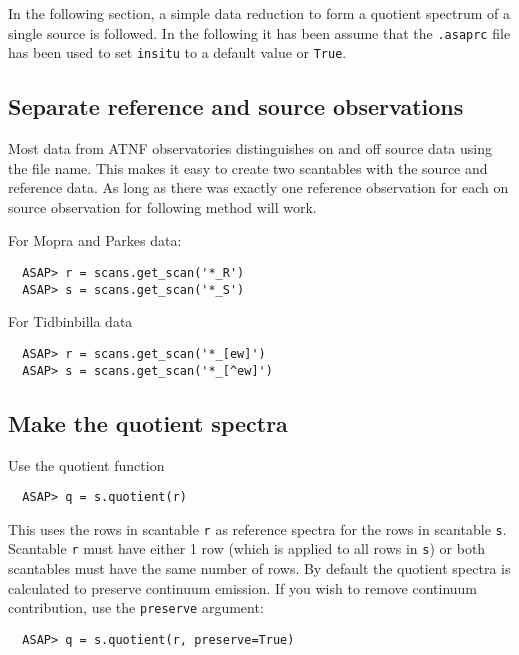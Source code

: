 \documentclass[11pt]{article}
\newcommand{\cmd}[1]{{\tt #1}}
\begin{document}
In the following section, a simple data reduction to form a quotient
spectrum of a single source is followed. In the following it has been
assume that the \cmd{.asaprc} file has been used to set \cmd{insitu}
to a default value or \cmd{True}.



\subsection{Separate reference and source observations}

Most data from ATNF observatories distinguishes on and off source data
using the file name. This makes it easy to create two scantables with
the source and reference data. As long as there was exactly one
reference observation for each on source observation for following
method will work.

For Mopra and Parkes data:
\begin{verbatim}
  ASAP> r = scans.get_scan('*_R')
  ASAP> s = scans.get_scan('*_S')
\end{verbatim}

For Tidbinbilla data
\begin{verbatim}
  ASAP> r = scans.get_scan('*_[ew]')
  ASAP> s = scans.get_scan('*_[^ew]')
\end{verbatim}

\subsection{Make the quotient spectra}

Use the quotient function

\begin{verbatim}
  ASAP> q = s.quotient(r)
\end{verbatim}

This uses the rows in scantable \cmd{r} as reference spectra for the
rows in scantable \cmd{s}. Scantable \cmd{r} must have either 1 row
(which is applied to all rows in \cmd{s}) or both scantables must have
the same number of rows. By default the quotient spectra is calculated
to preserve continuum emission. If you wish to remove continuum
contribution, use the \cmd{preserve} argument:

\begin{verbatim}
  ASAP> q = s.quotient(r, preserve=True)
\end{verbatim}
\end{document}
